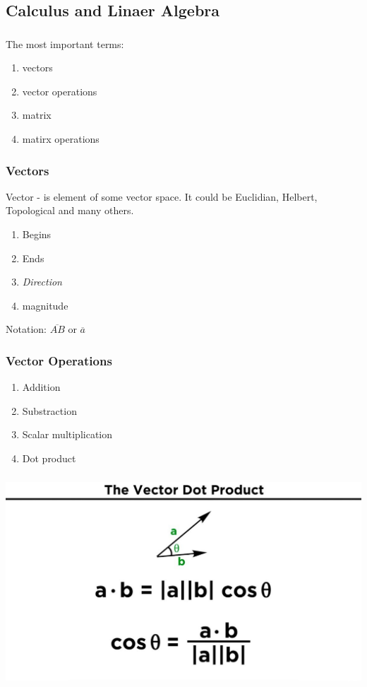 \documentclass[t, 11pt]{beamer}
\begin{document}
\subsection{Calculus and Linaer Algebra }
\begin{frame} 
	\frametitle{\insertsection} 
	\frametitle{\insertsubsection} 
	The most important terms:
	\begin{enumerate}
		\item vectors
		\item vector operations
		\item matrix
		\item matirx operations
	\end{enumerate}
\end{frame}

\begin{frame} 
	\frametitle{\insertsection} 
	\frametitle{Vectors} 
	Vector - is element of some vector space. It could be Euclidian, Helbert, Topological and many others.  
	\begin{enumerate}
		\item Begins
		\item Ends
		\item \emph{Direction}
		\item magnitude
	\end{enumerate}
\vspace{1cm}
Notation: $\overline{AB}$ or $\overline{a}$
\end{frame}

\begin{frame} 
	\frametitle{\insertsection} 
	\frametitle{Vector Operations} 
	\begin{enumerate}
		\item Addition
		\item Substraction
		\item Scalar multiplication
		\item Dot product 
	\end{enumerate}

\end{frame}
	
\begin{frame} 
	\frametitle{} 
	\frametitle{} 
\includegraphics[scale=0.3]{dotprod}	
\end{frame}	
\end{document}

